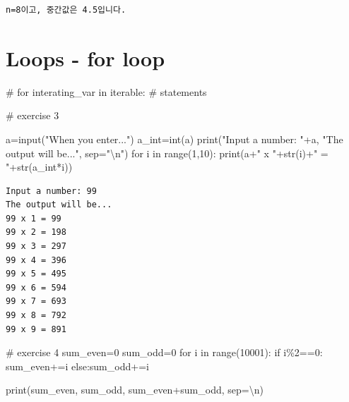 \documentclass[
  letterpaper,
  DIV=11,
  numbers=noendperiod]{scrreprt}
\newenvironment{Shaded}{\begin{snugshade}}{\end{snugshade}}
\newcommand{\BuiltInTok}[1]{\textcolor[rgb]{0.00,0.23,0.31}{#1}}
\newcommand{\CharTok}[1]{\textcolor[rgb]{0.13,0.47,0.30}{#1}}
\newcommand{\CommentTok}[1]{\textcolor[rgb]{0.37,0.37,0.37}{#1}}
\newcommand{\ControlFlowTok}[1]{\textcolor[rgb]{0.00,0.23,0.31}{#1}}
\newcommand{\DecValTok}[1]{\textcolor[rgb]{0.68,0.00,0.00}{#1}}
\newcommand{\KeywordTok}[1]{\textcolor[rgb]{0.00,0.23,0.31}{#1}}
\newcommand{\NormalTok}[1]{\textcolor[rgb]{0.00,0.23,0.31}{#1}}
\newcommand{\OperatorTok}[1]{\textcolor[rgb]{0.37,0.37,0.37}{#1}}
\newcommand{\StringTok}[1]{\textcolor[rgb]{0.13,0.47,0.30}{#1}}
\begin{document}
\begin{verbatim}
n=8이고, 중간값은 4.5입니다.
\end{verbatim}

\section{Loops - for loop}\label{loops---for-loop}

\begin{Shaded}
\begin{Highlighting}[]
\CommentTok{\# for interating\_var in iterable:}
\CommentTok{\#    statements}
\end{Highlighting}
\end{Shaded}

\begin{Shaded}
\begin{Highlighting}[]
\CommentTok{\# exercise 3}

\NormalTok{a}\OperatorTok{=}\BuiltInTok{input}\NormalTok{(}\StringTok{"When you enter..."}\NormalTok{)}
\NormalTok{a\_int}\OperatorTok{=}\BuiltInTok{int}\NormalTok{(a)}
\BuiltInTok{print}\NormalTok{(}\StringTok{"Input a number: "}\OperatorTok{+}\NormalTok{a,}
          \StringTok{"The output will be..."}\NormalTok{,}
\NormalTok{          sep}\OperatorTok{=}\StringTok{"}\CharTok{\textbackslash{}n}\StringTok{"}\NormalTok{)}
\ControlFlowTok{for}\NormalTok{ i }\KeywordTok{in} \BuiltInTok{range}\NormalTok{(}\DecValTok{1}\NormalTok{,}\DecValTok{10}\NormalTok{):}
    \BuiltInTok{print}\NormalTok{(a}\OperatorTok{+}\StringTok{" x "}\OperatorTok{+}\BuiltInTok{str}\NormalTok{(i)}\OperatorTok{+}\StringTok{" = "}\OperatorTok{+}\BuiltInTok{str}\NormalTok{(a\_int}\OperatorTok{*}\NormalTok{i))}
\end{Highlighting}
\end{Shaded}

\begin{verbatim}
Input a number: 99
The output will be...
99 x 1 = 99
99 x 2 = 198
99 x 3 = 297
99 x 4 = 396
99 x 5 = 495
99 x 6 = 594
99 x 7 = 693
99 x 8 = 792
99 x 9 = 891
\end{verbatim}

\begin{Shaded}
\begin{Highlighting}[]
\CommentTok{\# exercise 4}
\NormalTok{sum\_even}\OperatorTok{=}\DecValTok{0}
\NormalTok{sum\_odd}\OperatorTok{=}\DecValTok{0}
\ControlFlowTok{for}\NormalTok{ i }\KeywordTok{in} \BuiltInTok{range}\NormalTok{(}\DecValTok{10001}\NormalTok{):}
    \ControlFlowTok{if}\NormalTok{ i}\OperatorTok{\%}\DecValTok{2}\OperatorTok{==}\DecValTok{0}\NormalTok{:}
\NormalTok{        sum\_even}\OperatorTok{+=}\NormalTok{i}
    \ControlFlowTok{else}\NormalTok{:sum\_odd}\OperatorTok{+=}\NormalTok{i}

\BuiltInTok{print}\NormalTok{(sum\_even,}
\NormalTok{      sum\_odd,}
\NormalTok{      sum\_even}\OperatorTok{+}\NormalTok{sum\_odd,}
\NormalTok{      sep}\OperatorTok{=}\StringTok{\textquotesingle{}}\CharTok{\textbackslash{}n}\StringTok{\textquotesingle{}}\NormalTok{)}
\end{Highlighting}
\end{Shaded}
\end{document}
